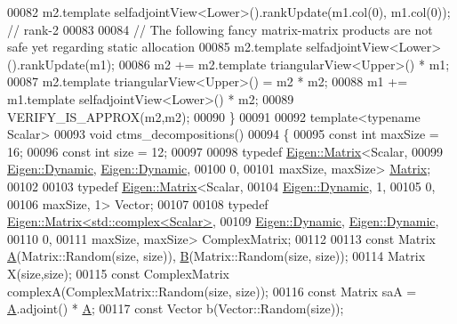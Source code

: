 \begin{DoxyCode}
00082   m2.template selfadjointView<Lower>().rankUpdate(m1.col(0), m1.col(0)); \textcolor{comment}{// rank-2}
00083 
00084   \textcolor{comment}{// The following fancy matrix-matrix products are not safe yet regarding static allocation}
00085   m2.template selfadjointView<Lower>().rankUpdate(m1);
00086   m2 += m2.template triangularView<Upper>() * m1;
00087   m2.template triangularView<Upper>() = m2 * m2;
00088   m1 += m1.template selfadjointView<Lower>() * m2;
00089   VERIFY\_IS\_APPROX(m2,m2);
00090 \}
00091 
00092 \textcolor{keyword}{template}<\textcolor{keyword}{typename} Scalar>
00093 \textcolor{keywordtype}{void} ctms\_decompositions()
00094 \{
00095   \textcolor{keyword}{const} \textcolor{keywordtype}{int} maxSize = 16;
00096   \textcolor{keyword}{const} \textcolor{keywordtype}{int} size    = 12;
00097 
00098   \textcolor{keyword}{typedef} \hyperlink{group___core___module_class_eigen_1_1_matrix}{Eigen::Matrix}<Scalar,
00099                         \hyperlink{namespace_eigen_ad81fa7195215a0ce30017dfac309f0b2}{Eigen::Dynamic}, \hyperlink{namespace_eigen_ad81fa7195215a0ce30017dfac309f0b2}{Eigen::Dynamic},
00100                         0,
00101                         maxSize, maxSize> \hyperlink{group___core___module_class_eigen_1_1_matrix}{Matrix};
00102 
00103   \textcolor{keyword}{typedef} \hyperlink{group___core___module_class_eigen_1_1_matrix}{Eigen::Matrix}<Scalar,
00104                         \hyperlink{namespace_eigen_ad81fa7195215a0ce30017dfac309f0b2}{Eigen::Dynamic}, 1,
00105                         0,
00106                         maxSize, 1> Vector;
00107 
00108   \textcolor{keyword}{typedef} \hyperlink{group___core___module_class_eigen_1_1_matrix}{Eigen::Matrix<std::complex<Scalar>},
00109                         \hyperlink{namespace_eigen_ad81fa7195215a0ce30017dfac309f0b2}{Eigen::Dynamic}, \hyperlink{namespace_eigen_ad81fa7195215a0ce30017dfac309f0b2}{Eigen::Dynamic},
00110                         0,
00111                         maxSize, maxSize> ComplexMatrix;
00112 
00113   \textcolor{keyword}{const} Matrix \hyperlink{group___core___module_class_eigen_1_1_matrix}{A}(Matrix::Random(size, size)), \hyperlink{group___core___module_class_eigen_1_1_matrix}{B}(Matrix::Random(size, size));
00114   Matrix X(size,size);
00115   \textcolor{keyword}{const} ComplexMatrix complexA(ComplexMatrix::Random(size, size));
00116   \textcolor{keyword}{const} Matrix saA = \hyperlink{group___core___module_class_eigen_1_1_matrix}{A}.adjoint() * \hyperlink{group___core___module_class_eigen_1_1_matrix}{A};
00117   \textcolor{keyword}{const} Vector b(Vector::Random(size));

\end{DoxyCode}
